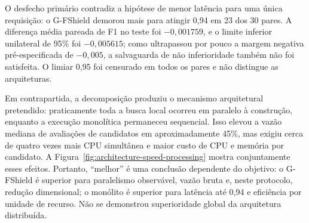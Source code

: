 \begin{landscape}
\begin{table}[p]
\centering
\scriptsize
\caption{Campanha causal: medianas por arquitetura e comparações pareadas em 30 sementes.}
\label{tab:architecture-causal}
\end{table}
\end{landscape}

O desfecho primário contradiz a hipótese de menor latência para uma única requisição: o G-FShield demorou mais para atingir 0,94 em 23 dos 30 pares. A diferença média pareada de F1 no teste foi $-0{,}001759$, e o limite inferior unilateral de 95\% foi $-0{,}005615$; como ultrapassou por pouco a margem negativa pré-especificada de $-0{,}005$, a salvaguarda de não inferioridade também não foi satisfeita. O limiar 0,95 foi censurado em todos os pares e não distingue as arquiteturas.

Em contrapartida, a decomposição produziu o mecanismo arquitetural pretendido: praticamente toda a busca local ocorreu em paralelo à construção, enquanto a execução monolítica permaneceu sequencial. Isso elevou a vazão mediana de avaliações de candidatos em aproximadamente 45\%, mas exigiu cerca de quatro vezes mais CPU simultânea e maior custo de CPU e memória por candidato. A Figura~\ref{fig:architecture-speed-processing} mostra conjuntamente esses efeitos. Portanto, ``melhor'' é uma conclusão dependente do objetivo: o G-FShield é superior para paralelismo observável, vazão bruta e, neste protocolo, redução dimensional; o monólito é superior para latência até 0,94 e eficiência por unidade de recurso. Não se demonstrou superioridade global da arquitetura distribuída.

